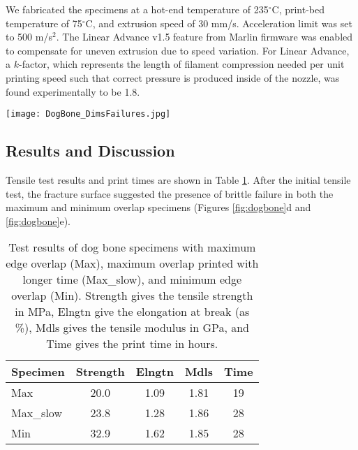 We fabricated the specimens at a hot-end temperature of 235$^\circ$C, print-bed temperature of 75$^\circ$C, and extrusion speed of 30 mm/s.
Acceleration limit was set to 500 m/s$^2$.
The Linear Advance v1.5 feature from Marlin firmware was enabled to compensate for uneven extrusion due to speed variation.
For Linear Advance, a $k$-factor, which represents the length of filament compression needed per unit printing speed such that correct pressure is produced inside of the nozzle, was found experimentally to be 1.8.

\begin{figure*}[htp!]
  \centering
  \texttt{[image: DogBone\_DimsFailures.jpg]}
  \caption{\label{fig:dogbone}
    Mechanical testing.
    a) Dog bone specimen dimensions in mm.
    b) Toolpath of a subdomain for maximum edge overlap.
    c) Final print of the subdomain.
    Failure surfaces shown for the maximum (d) and minimum (e) edge overlap cases are shown on the right, with specific features highlighted.
    }
\end{figure*}

\subsection{Results and Discussion}

Tensile test results and print times are shown in Table \ref{tab:dogboneResults}.
After the initial tensile test, the fracture surface suggested the presence of brittle failure in both the maximum and minimum overlap specimens (Figures \ref{fig:dogbone}d and \ref{fig:dogbone}e).

\begin{table}[htp!]
  \caption{  \label{tab:dogboneResults}
    Test results of dog bone specimens with maximum edge overlap (Max), maximum overlap printed with longer time (Max\_slow), and minimum edge overlap (Min).
    Strength gives the tensile strength in MPa, Elngtn give the elongation at break (as \%), Mdls gives the tensile modulus in GPa, and Time gives the print time in hours.
  }
  \centering
  \begin{tabular}{|l|c|c|c|c|} \hline
    Specimen & Strength & Elngtn & Mdls & Time  \\ \hline \hline
    Max & 20.0 & 1.09 & 1.81 & 19 \\ \hline
    Max\_slow & 23.8 & 1.28 & 1.86 & 28 \\ \hline
    Min & 32.9 & 1.62 & 1.85 & 28 \\ \hline
  \end{tabular}
\end{table}

